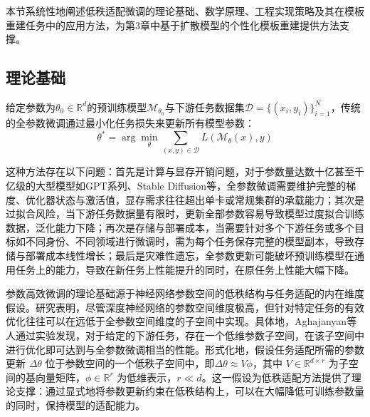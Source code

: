 本节系统性地阐述低秩适配微调的理论基础、数学原理、工程实现策略及其在模板重建任务中的应用方法，为第3章中基于扩散模型的个性化模板重建提供方法支撑。

\subsection{理论基础}

给定参数为$\theta_0\in\mathbb{R}^d$的预训练模型$\mathcal{M}_{\theta_0}$与下游任务数据集$\mathcal{D}=\{(x_i,y_i)\}_{i=1}^N$，传统的全参数微调通过最小化任务损失来更新所有模型参数：
\begin{equation}\label{eq:full_finetune}
      \theta^* = \arg\min_{\theta} \sum_{(x,y)\in\mathcal{D}} L(\mathcal{M}_{\theta}(x), y)
\end{equation}

这种方法存在以下问题：首先是计算与显存开销问题，对于参数量达数十亿甚至千亿级的大型模型如GPT系列、Stable Diffusion等，全参数微调需要维护完整的梯度、优化器状态与激活值，显存需求往往超出单卡或常规集群的承载能力；其次是过拟合风险，当下游任务数据量有限时，更新全部参数容易导致模型过度拟合训练数据，泛化能力下降；再次是存储与部署成本，当需要针对多个下游任务或多个目标如不同身份、不同领域进行微调时，需为每个任务保存完整的模型副本，导致存储与部署成本线性增长；最后是灾难性遗忘，全参数更新可能破坏预训练模型在通用任务上的能力，导致在新任务上性能提升的同时，在原任务上性能大幅下降。

参数高效微调的理论基础源于神经网络参数空间的低秩结构与任务适配的内在维度假设\cite{aghajanyan2021intrinsic}。研究表明，尽管深度神经网络的参数空间维度极高，但针对特定任务的有效优化往往可以在远低于全参数空间维度的子空间中实现。具体地，Aghajanyan等人通过实验发现，对于给定的下游任务，存在一个低维参数子空间，在该子空间中进行优化即可达到与全参数微调相当的性能。形式化地，假设任务适配所需的参数更新 $\Delta\theta$ 位于参数空间的一个低秩子空间中，即$\Delta\theta \approx V\phi$，其中 $V\in\mathbb{R}^{d\times r}$ 为子空间的基向量矩阵，$\phi\in\mathbb{R}^r$ 为低维表示，$r\ll d$。这一假设为低秩适配方法提供了理论支撑：通过显式地将参数更新约束在低秩结构上，可以在大幅降低可训练参数量的同时，保持模型的适配能力。

